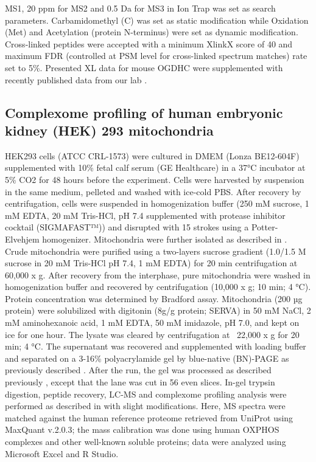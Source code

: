 MS1, 20 ppm for MS2 and 0.5 Da for MS3 in Ion Trap was set as search parameters. Carbamidomethyl (C) was set as static modification while Oxidation (Met) and Acetylation (protein N-terminus) were set as dynamic modification. Cross-linked peptides were accepted with a minimum XlinkX score of 40 and maximum FDR (controlled at PSM level for cross-linked spectrum matches) rate set to 5\%. Presented XL data for mouse OGDHC were supplemented with recently published data from our lab \cite{Liu_2018}.

\subsection*{Complexome profiling of human embryonic kidney (HEK) 293 mitochondria}
HEK293 cells (ATCC CRL-1573) were cultured in DMEM (Lonza BE12-604F) supplemented with 10\% fetal calf serum (GE Healthcare) in a 37°C incubator at 5\% CO2 for 48 hours before the experiment. Cells were harvested by suspension in the same medium, pelleted and washed with ice-cold PBS. After recovery by centrifugation, cells were suspended in homogenization buffer (250 mM sucrose, 1 mM EDTA, 20 mM Tris-HCl, pH 7.4 supplemented with protease inhibitor cocktail (SIGMAFAST™)) and disrupted with 15 strokes using a Potter-Elvehjem homogenizer. Mitochondria were further isolated as described in \cite{Guerrero-Castillo_2017}. Crude mitochondria were purified using a two-layers sucrose gradient (1.0/1.5 M sucrose in 20 mM Tris-HCl pH 7.4, 1 mM EDTA) for 20 min centrifugation at 60,000 x g. After recovery from the interphase, pure mitochondria were washed in homogenization buffer and recovered by centrifugation (10,000 x g; 10 min; 4 °C). Protein concentration was determined by Bradford assay. Mitochondria (200 µg protein) were solubilized with digitonin (8g/g protein; SERVA) in 50 mM NaCl, 2 mM aminohexanoic acid, 1 mM EDTA, 50 mM imidazole, pH 7.0, and kept on ice for one hour. The lysate was cleared by centrifugation at ~22,000 x g for 20 min; 4 °C. The supernatant was recovered and supplemented with loading buffer and separated on a 3-16\% polyacrylamide gel by blue-native (BN)-PAGE as previously described \cite{Wittig_2006}. After the run, the gel was processed as described previously \cite{Evers_2021}, except that the lane was cut in 56 even slices. In-gel trypsin digestion, peptide recovery, LC-MS and complexome profiling analysis were performed as described in \cite{Evers_2021} with slight modifications. Here, MS spectra were matched against the human reference proteome retrieved from UniProt using MaxQuant v.2.0.3; the mass calibration was done using human OXPHOS complexes and other well-known soluble proteins; data were analyzed using Microsoft Excel and R Studio.

